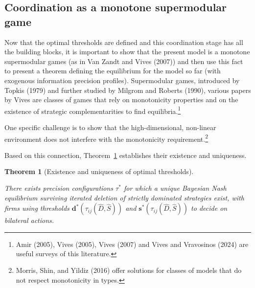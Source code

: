 \documentclass[
]{article}
\theoremstyle{definition}
\theoremstyle{plain}
\newtheorem{theorem}{Theorem}[section]
\theoremstyle{remark}
\begin{document}
\subsection{Coordination as a monotone supermodular
game}\label{coordination-as-a-monotone-supermodular-game}

Now that the optimal thresholds are defined and this coordination stage
has all the building blocks, it is important to show that the present
model is a monotone supermodular games (as in Van Zandt and Vives
(2007)) and then use this fact to present a theorem defining the
equilibrium for the model so far (with exogenous information precision
profiles). Supermodular games, introduced by Topkis (1979) and further
studied by Milgrom and Roberts (1990), various papers by Vives are
classes of games that rely on monotonicity properties and on the
existence of strategic complementarities to find equilibria.\footnote{Amir
  (2005), Vives (2005), Vives (2007) and Vives and Vravosinos (2024) are
  useful surveys of this literature.}

One specific challenge is to show that the high-dimensional, non-linear
environment does not interfere with the monotonicity
requirement.\footnote{Morris, Shin, and Yildiz (2016) offer solutions
  for classes of models that do not respect monotonicity in types.}

Based on this connection, Theorem~\ref{thm-optmthresh} establishes their
existence and uniqueness.

\begin{theorem}[Existence and uniqueness of optimal
thresholds]\protect\hypertarget{thm-optmthresh}{}\label{thm-optmthresh}

There exists precision configurations \(\tau^*\) for which a unique
Bayesian Nash equilibrium surviving iterated deletion of strictly
dominated strategies exist, with firms using thresholds
\(\mathbf{d}^*(\tau_{ij}(\hat{D}, \hat{S}))\) and
\(\mathbf{s}^*(\tau_{ij}(\hat{D}, \hat{S}))\) to decide on bilateral
actions.

\end{theorem}
\end{document}
